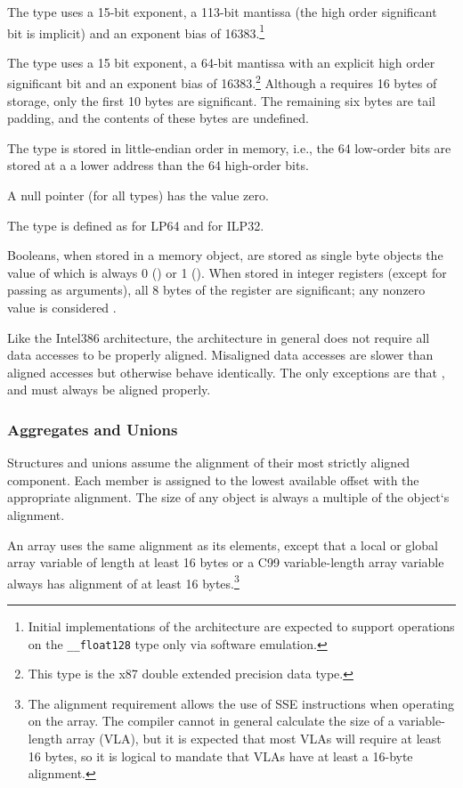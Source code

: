 The  type uses a 15-bit exponent, a 113-bit
mantissa (the high order significant bit is implicit) and an exponent
bias of 16383.\footnote{Initial implementations of the \xARCH
  architecture are expected to support operations on the
  \texttt{__float128} type only via software emulation.}

The  type uses a 15 bit exponent, a 64-bit mantissa
with an explicit high order significant bit and an exponent bias of
16383.\footnote{This type is the x87 double extended precision data
  type.}  Although a  requires 16 bytes of storage,
only the first 10 bytes are significant.  The remaining six bytes are
tail padding, and the contents of these bytes are undefined.

The  type is stored in little-endian order in memory,
i.e., the 64 low-order bits are stored at a a lower address than the
64 high-order bits.

A null pointer (for all types) has the value zero.

The type  is defined as  for LP64
and  for ILP32.

Booleans, when stored in a memory object, are stored as
single byte objects the value of which is always 0 () or 1
().  When stored in integer registers (except for passing
as arguments), all 8 bytes of the register are significant;
any nonzero value is considered .

Like the Intel386 architecture, the \xARCH architecture in general
does not require all data accesses to be properly aligned.  Misaligned
data accesses are slower than aligned accesses
but otherwise behave identically.  The only exceptions are that
,  and  must always be aligned
properly.

\subsubsection{Aggregates and Unions}

Structures and unions assume the alignment of their most strictly
aligned component.  Each member is assigned to the lowest available
offset with the appropriate alignment.  The size of any object is always
a multiple of the object`s alignment.

An array uses the same alignment as its elements, except that a local
or global array variable of length at least 16 bytes or a C99
variable-length array variable always has alignment
of at least 16 bytes.\footnote{The alignment requirement allows the
  use of SSE instructions when operating on the array.  The compiler
  cannot in general calculate the size of a variable-length array (VLA), but
  it is expected that most VLAs will require at least 16 bytes, so it
  is logical to mandate that VLAs have at least a 16-byte alignment.}

